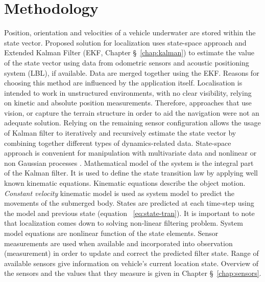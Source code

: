 \chapter{Methodology} \label{chap:methodology}
Position, orientation and velocities of a vehicle underwater are stored within the state vector. Proposed solution for localization uses state-space approach and Extended Kalman Filter (EKF, Chapter \S~\ref{chap:kalman}) to estimate the value of the state vector using data from odometric sensors and acoustic positioning system (LBL), if available. Data are merged together using the EKF. Reasons for choosing this method are influenced by the application itself. Localisation is intended to work in unstructured environments, with no clear visibility, relying on kinetic and absolute position measurements. Therefore, approaches that use vision, or capture the terrain structure in order to aid the navigation were not an adequate solution. Relying on the remaining sensor configuration allows the usage of Kalman filter to iteratively and recursively estimate the state vector by combining together different types of dynamics-related data. State-space approach is convenient for manipulation with multivariate data and nonlinear or non Gaussian processes \cite{ristic04}. Mathematical model of the system is the integral part of the Kalman filter. It is used to define the state transition law by applying well known kinematic equations.  Kinematic equations describe the object motion. \textit{Constant velocity} kinematic model is used as system model to predict the movements of the submerged body. States are predicted at each time-step using the model and previous state (equation ~\ref{eq:state-tran}). It is important to note that localization comes down to solving non-linear filtering problem. System model equations are nonlinear function of the state elements. Sensor measurements are used when available and incorporated into observation (measurement) in order to update and correct the predicted filter state. Range of available sensors give information on vehicle's current location state. Overview of the sensors and the values that they measure is given in Chapter \S~\ref{chap:sensors}.

